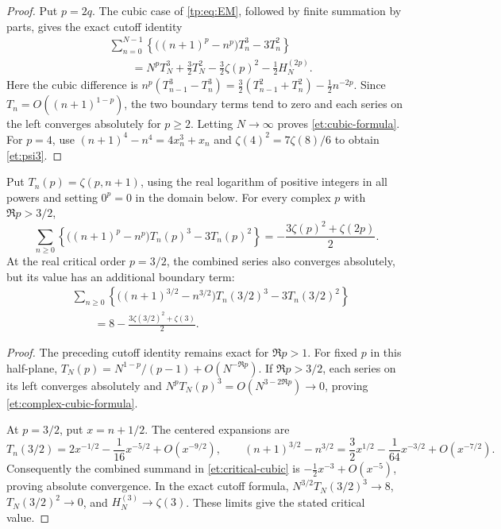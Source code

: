 \begin{proof}
Put $p=2q$. The cubic case of \eqref{tp:eq:EM}, followed by finite
summation by parts, gives the exact cutoff identity
\begin{align*}
 &\sum_{n=0}^{N-1}\left\{
       \bigl((n+1)^p-n^p\bigr)T_n^3-3T_n^2\right\}\\
 &\qquad=N^pT_N^3+\frac32T_N^2
       -\frac32\zeta(p)^2-\frac12H_N^{(2p)}.
\end{align*}
Here the cubic difference is
$n^p(T_{n-1}^3-T_n^3)
 =\tfrac32(T_{n-1}^2+T_n^2)-\tfrac12n^{-2p}$.
Since $T_n=O((n+1)^{1-p})$, the two boundary terms tend to zero
and each series on the left converges absolutely for $p\geq2$.
Letting $N\to\infty$ proves \eqref{et:cubic-formula}.
For $p=4$, use $(n+1)^4-n^4=4x_n^3+x_n$ and
$\zeta(4)^2=7\zeta(8)/6$ to obtain \eqref{et:psi3}.
\end{proof}

\begin{corollary}
\label{et:complex-cubic}
Put $T_n(p)=\zeta(p,n+1)$, using the real logarithm of positive
integers in all powers and setting $0^p=0$ in the domain below.
For every complex $p$ with $\Re p>3/2$,
\begin{equation}\label{et:complex-cubic-formula}
 \sum_{n\geq0}\left\{
    \bigl((n+1)^p-n^p\bigr)T_n(p)^3-3T_n(p)^2\right\}
       =-\frac{3\zeta(p)^2+\zeta(2p)}2.
\end{equation}
At the real critical order $p=3/2$, the combined series also converges
absolutely, but its value has an additional boundary term:
\begin{equation}\label{et:critical-cubic}
 \boxed{\begin{aligned}
 &\sum_{n\geq0}\left\{
    \bigl((n+1)^{3/2}-n^{3/2}\bigr)T_n(3/2)^3-3T_n(3/2)^2\right\}
 \\[-1mm]
 &\qquad=8-\frac{3\zeta(3/2)^2+\zeta(3)}2.
 \end{aligned}}
\end{equation}
\end{corollary}

\begin{proof}
The preceding cutoff identity remains exact for $\Re p>1$.
For fixed $p$ in this half-plane,
$T_N(p)=N^{1-p}/(p-1)+O(N^{-\Re p})$.
If $\Re p>3/2$, each series on its left converges absolutely and
$N^pT_N(p)^3=O(N^{3-2\Re p})\to0$, proving
\eqref{et:complex-cubic-formula}.

At $p=3/2$, put $x=n+1/2$. The centered expansions are
\[
 T_n(3/2)=2x^{-1/2}-\frac1{16}x^{-5/2}+O(x^{-9/2}),\qquad
 (n+1)^{3/2}-n^{3/2}
       =\frac32x^{1/2}-\frac1{64}x^{-3/2}+O(x^{-7/2}).
\]
Consequently the combined summand in \eqref{et:critical-cubic} is
$-\tfrac12x^{-3}+O(x^{-5})$, proving absolute convergence.
In the exact cutoff formula,
$N^{3/2}T_N(3/2)^3\to8$, $T_N(3/2)^2\to0$, and
$H_N^{(3)}\to\zeta(3)$. These limits give the stated critical value.
\end{proof}


